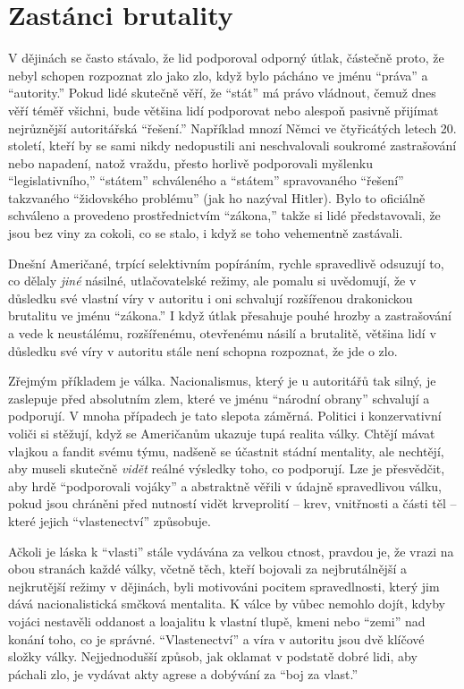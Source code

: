 \documentclass{book}
\begin{document}
\section{Zastánci brutality}

V dějinách se často stávalo, že lid podporoval odporný útlak, částečně proto, že nebyl schopen rozpoznat zlo jako zlo, když bylo pácháno ve jménu \enquote{práva} a \enquote{autority.} Pokud lidé skutečně věří, že \enquote{stát} má právo vládnout, čemuž dnes věří téměř všichni, bude většina lidí podporovat nebo alespoň pasivně přijímat nejrůznější autoritářská \enquote{řešení.} Například mnozí Němci ve čtyřicátých letech 20. století, kteří by se sami nikdy nedopustili ani neschvalovali soukromé zastrašování nebo napadení, natož vraždu, přesto horlivě podporovali myšlenku \enquote{legislativního,} \enquote{státem} schváleného a \enquote{státem} spravovaného \enquote{řešení} takzvaného \enquote{židovského problému} (jak ho nazýval Hitler). Bylo to oficiálně schváleno a provedeno prostřednictvím \enquote{zákona,} takže si lidé představovali, že jsou bez viny za cokoli, co se stalo, i když se toho vehementně zastávali.

Dnešní Američané, trpící selektivním popíráním, rychle spravedlivě odsuzují to, co dělaly \emph{jiné} násilné, utlačovatelské režimy, ale pomalu si uvědomují, že v důsledku své vlastní víry v autoritu i oni schvalují rozšířenou drakonickou brutalitu ve jménu \enquote{zákona.} I když útlak přesahuje pouhé hrozby a zastrašování a vede k neustálému, rozšířenému, otevřenému násilí a brutalitě, většina lidí v důsledku své víry v autoritu stále není schopna rozpoznat, že jde o zlo.

Zřejmým příkladem je válka. Nacionalismus, který je u autoritářů tak silný, je zaslepuje před absolutním zlem, které ve jménu \enquote{národní obrany} schvalují a podporují. V mnoha případech je tato slepota záměrná. Politici i konzervativní voliči si stěžují, když se Američanům ukazuje tupá realita války. Chtějí mávat vlajkou a fandit svému týmu, nadšeně se účastnit stádní mentality, ale nechtějí, aby museli skutečně \emph{vidět} reálné výsledky toho, co podporují. Lze je přesvědčit, aby hrdě \enquote{podporovali vojáky} a abstraktně věřili v údajně spravedlivou válku, pokud jsou chráněni před nutností vidět krveprolití -- krev, vnitřnosti a části těl -- které jejich \enquote{vlastenectví} způsobuje.

Ačkoli je láska k \enquote{vlasti} stále vydávána za velkou ctnost, pravdou je, že vrazi na obou stranách každé války, včetně těch, kteří bojovali za nejbrutálnější a nejkrutější režimy v dějinách, byli motivováni pocitem spravedlnosti, který jim dává nacionalistická smčková mentalita. K válce by vůbec nemohlo dojít, kdyby vojáci nestavěli oddanost a loajalitu k vlastní tlupě, kmeni nebo \enquote{zemi} nad konání toho, co je správné. \enquote{Vlastenectví} a víra v autoritu jsou dvě klíčové složky války. Nejjednodušší způsob, jak oklamat v podstatě dobré lidi, aby páchali zlo, je vydávat akty agrese a dobývání za \enquote{boj za vlast.}
\end{document}

